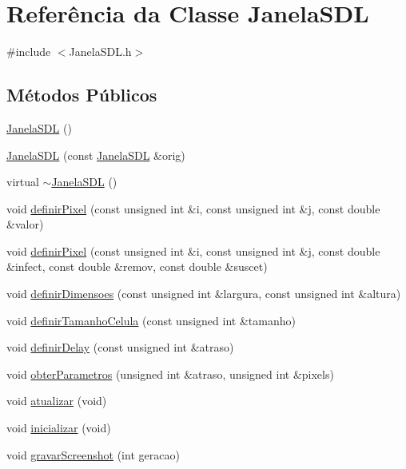 \hypertarget{class_janela_s_d_l}{
\section{Referência da Classe JanelaSDL}
\label{class_janela_s_d_l}
}


{\ttfamily \#include $<$JanelaSDL.h$>$}

\subsection*{Métodos Públicos}
\begin{DoxyCompactItemize}
\item 
\hyperlink{class_janela_s_d_l_a2eec97216ce371dbbe03c2e4e9a41e4b}{JanelaSDL} ()
\item 
\hyperlink{class_janela_s_d_l_a15cf9c51357c22bce193477f4ac7a2dd}{JanelaSDL} (const \hyperlink{class_janela_s_d_l}{JanelaSDL} \&orig)
\item 
virtual \hyperlink{class_janela_s_d_l_af996f58d344679256c3d4c09c338deca}{$\sim$JanelaSDL} ()
\item 
void \hyperlink{class_janela_s_d_l_ad358f013c7587c3d5d47fcf56f72909b}{definirPixel} (const unsigned int \&i, const unsigned int \&j, const double \&valor)
\item 
void \hyperlink{class_janela_s_d_l_a6a89b3c9bf78990770e582617fb22185}{definirPixel} (const unsigned int \&i, const unsigned int \&j, const double \&infect, const double \&remov, const double \&suscet)
\item 
void \hyperlink{class_janela_s_d_l_ad92093f821d7cb3ec41ddbfdd1ab1a77}{definirDimensoes} (const unsigned int \&largura, const unsigned int \&altura)
\item 
void \hyperlink{class_janela_s_d_l_a51301fb0e8c3b53d6bb3faedaf3a5dcc}{definirTamanhoCelula} (const unsigned int \&tamanho)
\item 
void \hyperlink{class_janela_s_d_l_a84602b28e1c9efd3c8c084f8040ecf48}{definirDelay} (const unsigned int \&atraso)
\item 
void \hyperlink{class_janela_s_d_l_adf692841537b500f1208fd1934b417f5}{obterParametros} (unsigned int \&atraso, unsigned int \&pixels)
\item 
void \hyperlink{class_janela_s_d_l_a0692d0d559cd572448cbfa09e4864a6b}{atualizar} (void)
\item 
void \hyperlink{class_janela_s_d_l_aef56b2be96ec1661e666f08b169eb130}{inicializar} (void)
\item 
void \hyperlink{class_janela_s_d_l_a3bfc26d91a1dfd54c6c99fa69c1f4058}{gravarScreenshot} (int geracao)
\end{DoxyCompactItemize}



